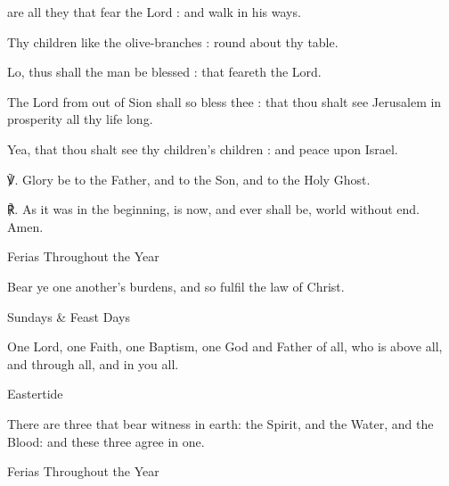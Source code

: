 \begin{multicols}{2}
 are all they that fear the Lord : and walk in his ways.\par
{}
Thy children like the olive-branches : round about thy table.\par
{}Lo, thus shall the man be blessed : that feareth the Lord.\par
{}The Lord from out of Sion shall so bless thee : that thou shalt see Jerusalem in prosperity all thy life long.\par
{}Yea, that thou shalt see thy children's children : and peace upon Israel.\par
℣. Glory be to the Father, and to the Son, and to the Holy Ghost.\par
℟. As it was in the beginning, is now, and ever shall be, world without end. Amen.

\begin{inhead}
	Ferias Throughout the Year
\end{inhead}\par\noindent
Bear ye one another's burdens, and so fulfil the law of Christ.

\begin{inhead}
	Sundays \& Feast Days
\end{inhead}\par\noindent
One Lord, one Faith, one Baptism, one God and Father of all, who is above all, and through all, and in you all.

\begin{inhead}
	Eastertide
\end{inhead}\par\noindent
There are three that bear witness in earth: the Spirit, and the Water, and the Blood: and these three agree in one.


\begin{inhead}
	Ferias Throughout the Year
\end{inhead}




\end{multicols}
